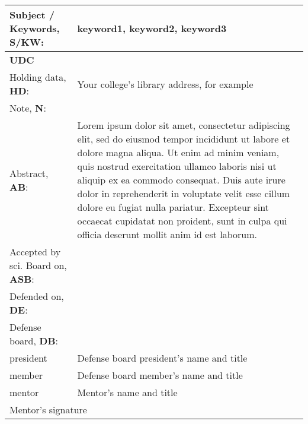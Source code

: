{\begin{longtable}{| p{} | p{} |}
        Subject / Keywords, \textbf{S/KW}:              & keyword1, keyword2, keyword3 \\ \hline
        \textbf{UDC}                                    & \\ \hline
        Holding data, \textbf{HD}:                      & Your college's library address, for example \\ \hline
        Note, \textbf{N}:                               & \\ \hline
        Abstract, \textbf{AB}:                          & Lorem ipsum dolor sit amet, consectetur adipiscing elit, sed do eiusmod tempor incididunt ut labore et dolore magna aliqua. Ut enim ad minim veniam, quis nostrud exercitation ullamco laboris nisi ut aliquip ex ea commodo consequat. Duis aute irure dolor in reprehenderit in voluptate velit esse cillum dolore eu fugiat nulla pariatur. Excepteur sint occaecat cupidatat non proident, sunt in culpa qui officia deserunt mollit anim id est laborum.    \\ \hline
        Accepted by sci. Board on, \textbf{ASB}:        & \\ \hline
        Defended on, \textbf{DE}:                       & \\ \hline
        Defense board, \textbf{DB}:                     & \\ \hline
        \quad president                                 & Defense board president's name and title \\ \hline 
        \quad member                                    & Defense board member's name and title \\ \hline 
        \quad mentor                                    & Mentor's name and title \\ \hline 
        \multicolumn{2}{|l|}{Mentor's signature} \\[25pt] \hline
    \end{longtable}
}

\newpage %
\pagestyle{plain} %